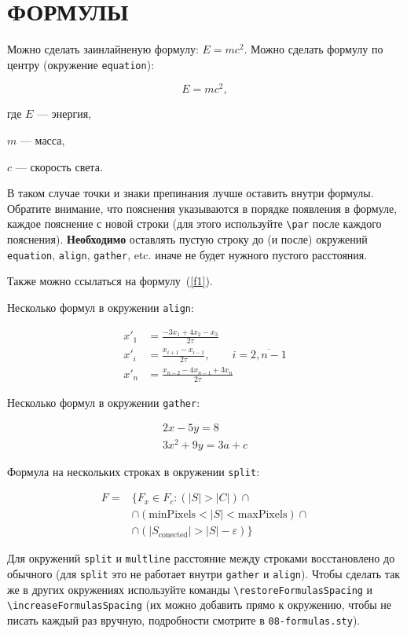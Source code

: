 \section{ФОРМУЛЫ}

Можно сделать заинлайненую формулу: $E = mc^2$. Можно сделать формулу по центру (окружение \texttt{equation}):

\begin{equation}
    \label{f1}
    E = mc^2,
\end{equation}

где $E$ --- энергия,\par $m$ --- масса,\par $c$ --- скорость света.

В таком случае точки и знаки препинания лучше оставить внутри формулы. Обратите внимание, что пояснения указываются в порядке появления в формуле, каждое пояснение с новой строки (для этого используйте \texttt{\textbackslash par} после каждого пояснения). \textbf{Необходимо} оставлять пустую строку до (и после) окружений \texttt{equation}, \texttt{align}, \texttt{gather}, etc. иначе не будет нужного пустого расстояния.  

Также можно ссылаться на формулу~(\ref{f1}).

Несколько формул в окружении \texttt{align}:

\begin{align}
x'_1 &= \frac{-3 x_1 + 4 x_2 - x_3}{2 \tau} \\
x'_i &= \frac{x_{i+1} - x_{i-1}}{2 \tau}, \qquad i = \overline{2, n-1} \\
x'_n &= \frac{x_{n-2} - 4 x_{n-1} + 3 x_n}{2 \tau}
\end{align}

Несколько формул в окружении \texttt{gather}:

\begin{gather} 
2x - 5y =  8 \\ 
3x^2 + 9y =  3a + c
\end{gather}

Формула на нескольких строках в окружении \texttt{split}:

\begin{equation}
\begin{split}
F = {} &\{F_{x} \in  F_{c} : (|S| > |C|) \cap {} \\
& \cap (\mathrm{minPixels}  < |S| < \mathrm{maxPixels}) \cap {} \\
& \cap (|S_{\mathrm{conected}}| > |S| - \varepsilon) \}
\end{split}
\end{equation}

Для окружений \texttt{split} и \texttt{multline} расстояние между строками восстановлено до обычного
(для \texttt{split} это не работает внутри \texttt{gather} и \texttt{align}). 
Чтобы сделать так же в других окружениях используйте команды \texttt{\textbackslash restoreFormulasSpacing} и \texttt{\textbackslash increaseFormulasSpacing}
(их можно добавить прямо к окружению, чтобы не писать каждый раз вручную, подробности смотрите в \texttt{08-formulas.sty}).